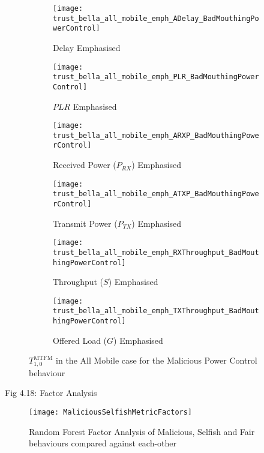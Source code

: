 \documentclass[aspectratio=169]{beamer}
\begin{document}
\begin{frame}
	\begin{figure}[h]
		\centering
		\begin{subfigure}{0.3\textwidth}
			\texttt{[image: trust\_bella\_all\_mobile\_emph\_ADelay\_BadMouthingPowerControl]} 
			\caption{$\text{Delay}$ Emphasised}
			\label{fig:all_mobile_badmouthing_delay}
		\end{subfigure}
		\begin{subfigure}{0.3\textwidth}
			\texttt{[image: trust\_bella\_all\_mobile\_emph\_PLR\_BadMouthingPowerControl]} 
			\caption{$PLR$ Emphasised}
			\label{fig:all_mobile_badmouthing_plr}
		\end{subfigure}
		\begin{subfigure}{0.3\textwidth}
			\texttt{[image: trust\_bella\_all\_mobile\_emph\_ARXP\_BadMouthingPowerControl]} 
			\caption{Received Power ($P_{RX}$) Emphasised}
			\label{fig:all_mobile_badmouthing_rxp}
		\end{subfigure}	
		\begin{subfigure}{0.3\textwidth}
			\texttt{[image: trust\_bella\_all\_mobile\_emph\_ATXP\_BadMouthingPowerControl]} 
			\caption{Transmit Power ($P_{TX}$) Emphasised}
			\label{fig:all_mobile_badmouthing_txp}
		\end{subfigure}
		\begin{subfigure}{0.3\textwidth}
			\texttt{[image: trust\_bella\_all\_mobile\_emph\_RXThroughput\_BadMouthingPowerControl]} 
			\caption{Throughput ($S$) Emphasised}
			\label{fig:all_mobile_badmouthing_rxthroughput}
		\end{subfigure}
		\begin{subfigure}{0.3\textwidth}
			\texttt{[image: trust\_bella\_all\_mobile\_emph\_TXThroughput\_BadMouthingPowerControl]} 
			\caption{Offered Load ($G$) Emphasised}
			\label{fig:all_mobile_badmouthing_txthroughput}
		\end{subfigure}
		\caption{$T_{1,0}^\text{MTFM}$ in the All Mobile case for the Malicious Power Control behaviour}
		\label{fig:all_mobile_badmouthing}
	\end{figure}
\end{frame}

\begin{frame}{Fig 4.18: Factor Analysis}
	\begin{figure}
		\centering
		\texttt{[image: MaliciousSelfishMetricFactors]}
		\caption{Random Forest Factor Analysis of Malicious, Selfish and Fair behaviours compared against each-other}
		\label{fig:malselfactors}
	\end{figure}
\end{frame}
\end{document}
